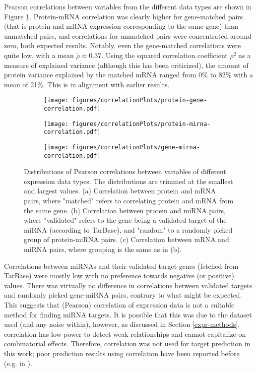 Pearson correlations between variables from the different data types are shown in Figure
\ref{fig:correlations}. Protein-mRNA correlation was clearly higher for gene-matched pairs
(that is protein and mRNA expression corresponding to the same gene) than unmatched pairs,
and correlations for unmatched pairs were concentrated around zero, both expected
results. Notably, even the gene-matched correlations were quite low, with a
mean $\bar{\rho} \approx 0.37$. Using the squared correlation coefficient $\rho^2$ as a
measure of explained variance (although this has been criticized), the amount
of protein variance explained by the matched mRNA ranged from 0\% to 82\% with a mean of
21\%. This is in alignment with earlier results.

\begin{figure}[!h]
  \centering
  \begin{subfigure}{.45\textwidth}
    \subcaption{ \label{fig:protein-gene-cor}}
    \centering
    \texttt{[image: figures/correlationPlots/protein-gene-correlation.pdf]}
  \end{subfigure}
  \begin{subfigure}{.45\textwidth}
    \subcaption{ \label{fig:protein-mirna-cor}}
    \centering
    \texttt{[image: figures/correlationPlots/protein-mirna-correlation.pdf]}
  \end{subfigure}
  \begin{subfigure}{.45\textwidth}
    \subcaption{ \label{fig:gene-mirna-cor}}
    \texttt{[image: figures/correlationPlots/gene-mirna-correlation.pdf]}
  \end{subfigure}

  \caption{Distributions of Pearson correlations between variables of different expression data types.
  The distributions are trimmed at the smallest and largest values.
  (a) Correlation between protein and mRNA pairs, where "matched" refers to correlating
  protein and mRNA from the same gene.
  (b) Correlation between protein and miRNA pairs, where "validated" refers to the gene
  being a validated target of the miRNA (according to TarBase),
  and "random" to a randomly picked group of protein-miRNA pairs.
  (c) Correlation between mRNA and miRNA pairs,
  where grouping is the same as in (b).}
  \label{fig:correlations}
\end{figure}

Correlations between miRNAs and their validated target genes (fetched from
TarBase) were mostly low with no preference towards negative (or positive)
values. There was virtually no difference in correlations between validated
targets and randomly picked gene-miRNA pairs, contrary to what might be
expected. This suggests that (Pearson) correlation of expression data is not a
suitable method for finding miRNA targets. It is possible that this was due to
the dataset used (and any noise within), however, as discussed in
Section \ref{expr-methods}, correlation has low power to detect weak
relationships and cannot capitalize on combinatorial effects. Therefore,
correlation was not used for target prediction in this work; poor
prediction results using correlation have been reported before
(e.g. in \citep{Muniategui2012}).




